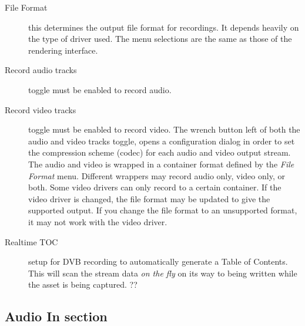 \begin{description}
    \item[File Format]  this determines the output file format for recordings. It depends heavily on the type of driver used. The menu selections are the same as those of the rendering interface.
    \item[Record audio tracks]  toggle must be enabled to record audio.
    \item[Record video tracks] toggle must be enabled to record video. The wrench  button left of both the audio and video tracks toggle, opens a configuration dialog in order to set the compression scheme (codec) for each audio and video output stream. The audio and video is wrapped in a container format defined by the \textit{File Format} menu. Different wrappers may record audio only, video only, or both.  Some video drivers can only record to a certain container. If the video driver is changed, the file format may be updated to give the supported output. If you change the file format to an unsupported format, it may not work with the video driver.
    \item[Realtime TOC] setup for DVB recording to automatically generate a Table of Contents. This will scan the stream data \textit{on the fly} on its way to being written while the asset is being captured. ??
\end{description}

\subsection{Audio In section}%
\label{sub:audio_in_section}

